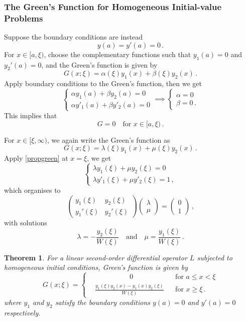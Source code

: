 \documentclass{article}
\theoremstyle{plain}\theoremheaderfont{\normalfont\itshape}\theorembodyfont{\rmfamily}\theoremseparator{.}\newtheorem*{rem}{Remark}\newtheorem*{ex}{Example}\newtheorem*{proof}{Proof}\newtheorem*{altp}{Alternative proof}
\theoremstyle{plain}\theoremheaderfont{\normalfont\bfseries}\theorembodyfont{\rmfamily}\theoremseparator{.}\newtheorem{thm}{Theorem}[section]\newtheorem{lem}[thm]{Lemma}\newtheorem{prop}[thm]{Proposition}\newtheorem*{cor}{Corollary}\newtheorem{defn}[thm]{Definition}\newtheorem{clm}[thm]{Claim}\newtheorem{clminproof}{Claim}
\theoremstyle{break}\theoremheaderfont{\normalfont\itshape}\theorembodyfont{\rmfamily}\theoremseparator{.\medskip}\newtheorem*{proofskip}{Proof}\newtheorem*{exs}{Examples}\newtheorem*{rems}{Remarks}
\theoremstyle{break}\theoremheaderfont{\normalfont\bfseries}\theorembodyfont{\rmfamily}\theoremseparator{.\medskip}\newtheorem{lemskip}[thm]{Lemma}\newtheorem{defnskip}[thm]{Definition}\newtheorem{propskip}[thm]{Proposition}\newtheorem{thmskip}[thm]{Theorem}
\numberwithin{equation}{section}
\begin{document}
	\subsubsection{The Green's Function for Homogeneous Initial-value Problems}
	Suppose the boundary conditions are instead
	\[y(a)=y'(a)=0\,.\]
	For \(x\in[a,\xi)\), choose the complementary functions such that \(y_1(a)=0\) and \(y_2'(a)=0\), and the Green's function is given by
	\[G(x;\xi)=\alpha(\xi)y_1(x)+\beta(\xi)y_2(x)\,.\]
	Apply boundary conditions to the Green's function, then we get
	\[\begin{cases}
		\alpha y_1(a)+\beta y_2(a)=0\\
		\alpha y'_1(a)+\beta y'_2(a)=0
	\end{cases}\implies\begin{cases}
		\alpha=0\\
		\beta=0\,.
	\end{cases}\]
	This implies that
	\[G=0\quad\text{for }x\in[a,\xi)\,.\]

	For \(x\in[\xi,\infty)\), we again write the Green's function as
	\[G(x;\xi)=\lambda(\xi)y_1(x)+\mu(\xi)y_2(x)\,.\]
	Apply \cref{propgreen} at \(x=\xi\), we get
	\[\begin{cases}
		\lambda y_1(\xi)+\mu y_2(\xi)=0\\
		\lambda y'_1(\xi)+\mu y'_2(\xi)=1\,,
	\end{cases}\]
	which organises to
	\[\begin{pmatrix}
		y_1(\xi) & y_2(\xi)\\
		y_1'(\xi) & y_2'(\xi)
	\end{pmatrix}\begin{pmatrix}
		\lambda\\
		\mu
	\end{pmatrix}=\begin{pmatrix}
		0\\
		1
	\end{pmatrix}\,,\]
	with solutions
	\[\lambda=-\frac{y_2(\xi)}{W(\xi)}\quad \text{and} \quad \mu=\frac{y_1(\xi)}{W(\xi)}\,.\]
	
	\begin{thm}
		For a linear second-order differential operator \(L\) subjected to homogeneous initial conditions, Green's function is given by
		\[G(x;\xi)=\left\{\begin{aligned}
			& \qquad\qquad\,\,\,\,\;0 && \text{for }a\le x<\xi\\
			&\frac{y_1(\xi)y_2(x)-y_1(x)y_2(\xi)}{W(\xi)} && \text{for }x\ge\xi\,.
		\end{aligned}\right.\]
		where \(y_1\) and \(y_2\) satisfy the boundary conditions \(y(a)=0\) and \(y'(a)=0\) respectively.
	\end{thm}
	
\end{document}

